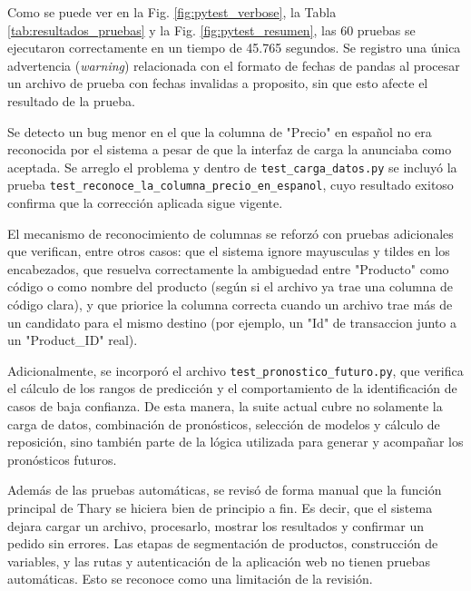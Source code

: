 Como se puede ver en la Fig. \ref{fig:pytest_verbose}, la Tabla \ref{tab:resultados_pruebas} y la Fig. \ref{fig:pytest_resumen}, las 60 pruebas se ejecutaron correctamente en un tiempo de 45.765 segundos. Se registro una única advertencia (\textit{warning}) relacionada con el formato de fechas de pandas al procesar un archivo de prueba con fechas invalidas a proposito, sin que esto afecte el resultado de la prueba.


Se detecto un bug menor en el que la columna de "Precio" en español no era reconocida por el sistema a pesar de que la interfaz de carga la anunciaba como aceptada. Se arreglo el problema y dentro de \texttt{test\_carga\_datos.py} se incluyó la prueba \texttt{test\_reconoce\_la\_columna\_precio\_en\_espanol}, cuyo resultado exitoso confirma que la corrección aplicada sigue vigente.

El mecanismo de reconocimiento de columnas se reforzó con pruebas adicionales que verifican, entre otros casos: que el sistema ignore mayusculas y tildes en los encabezados, que resuelva correctamente la ambiguedad entre "Producto" como código o como nombre del producto (según si el archivo ya trae una columna de código clara), y que priorice la columna correcta cuando un archivo trae más de un candidato para el mismo destino (por ejemplo, un "Id" de transaccion junto a un "Product\_ID" real).

Adicionalmente, se incorporó el archivo \texttt{test\_pronostico\_futuro.py}, que verifica el cálculo de los rangos de predicción y el comportamiento de la identificación de casos de baja confianza. De esta manera, la suite actual cubre no solamente la carga de datos, combinación de pronósticos, selección de modelos y cálculo de reposición, sino también parte de la lógica utilizada para generar y acompañar los pronósticos futuros.

Además de las pruebas automáticas, se revisó de forma manual que la función principal de Thary se hiciera bien de principio a fin. Es decir, que el sistema dejara cargar un archivo, procesarlo, mostrar los resultados y confirmar un pedido sin errores. Las etapas de segmentación de productos, construcción de variables, y las rutas y autenticación de la aplicación web no tienen pruebas automáticas. Esto se reconoce como una limitación de la revisión.